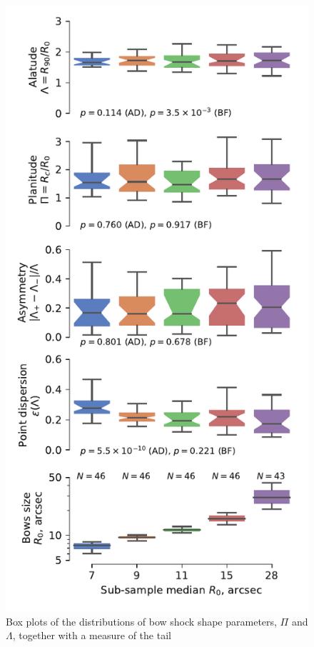 \begin{figure}
  \centering
  \includegraphics[width=\linewidth]
  {figs/mipsgal-boxplot-Rc-R90-versus-R0}
  \caption{Box plots of the distributions of bow shock shape
    parameters, \(\Pi\) and \(\Lambda\), together with a measure of the tail
}
\end{figure}

